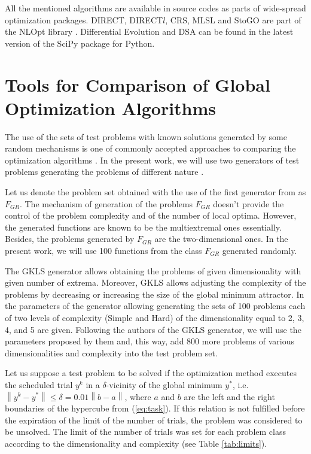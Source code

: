 \documentclass[runningheads]{llncs}
\begin{document}
All the mentioned algorithms are available in source codes as parts of wide-spread optimization packages.
DIRECT, DIRECT$l$, CRS, MLSL and StoGO are part of the NLOpt library \cite{nlopt}.
Differential Evolution and DSA can be found in
the latest version of the SciPy \cite{scipy} package for Python.

\section{Tools for Comparison of Global Optimization Algorithms}

The use of the sets of test problems with known solutions generated by some random mechanisms is
one of commonly accepted approaches to comparing the optimization algorithms
\cite{Beiranvand2017}. In the present work, we will use two generators of test problems generating
the problems of different nature \cite{grishaginClass, Gaviano2003}.

Let us denote the problem set obtained with the use of the first generator from \cite{grishaginClass}
as \(F_{GR}\). The mechanism of generation of the problems \(F_{GR}\) doesn't provide the
control of the problem complexity and of the number of local optima. However, the generated
functions are known to be the multiextremal ones essentially. Besides, the problems generated by
\(F_{GR}\) are the two-dimensional ones. In the present work, we will use 100 functions from the
class \(F_{GR}\) generated randomly.

The GKLS generator \cite{Gaviano2003} allows obtaining the problems of given dimensionality
with given number of extrema. Moreover, GKLS allows adjusting the complexity of the problems by
decreasing or increasing the size of the global minimum attractor. In
\cite{SergeyevKvasov2006} the parameters of the generator allowing generating the sets of 100
problems each of two levels of complexity (Simple and Hard) of the dimensionality equal to 2, 3, 4,
and 5 are given. Following the authors of the GKLS generator, we will use the parameters proposed
by them and, this way, add 800 more problems of various dimensionalities and complexity into the
test problem set.

Let us suppose a test problem to be solved if the optimization method executes the scheduled trial
\(y^k\) in a \(\delta\)-vicinity of the global minimum \(y^*\), i.e. $\left\|y^k-y^*\right\|\leq \delta
= 0.01\left\|b-a\right\|$, where \(a\) and \(b\) are the left and the right boundaries of the hypercube
from (\ref{eq:task}). If this relation is not fulfilled before the expiration of the limit of the number of
trials, the problem was considered to be unsolved. The limit of the number of trials was set
for each problem class according to the dimensionality and complexity (see Table \ref{tab:limits}).
\end{document}
